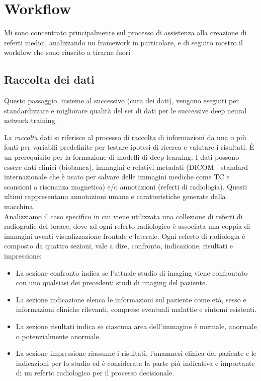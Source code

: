 \documentclass[12pt,a4paper]{report}
\begin{document}
\section{Workflow}
Mi sono concentrato principalmente sul processo di assistenza alla creazione di referti medici, analizzando un framework in particolare, e di seguito mostro il workflow che sono riuscito a tirarne fuori

\subsection{Raccolta dei dati}
Questo passaggio, insieme al successivo (cura dei dati), vengono eseguiti per standardizzare e migliorare qualità del set di dati per le successive deep neural network training.

La \emph{raccolta} dati si riferisce al processo di raccolta di informazioni da una o più fonti per variabili predefinite per testare ipotesi di ricerca e valutare i risultati. È un prerequisito per la formazione di modelli di deep learning. 
I dati possono essere dati clinici (biobanca), immagini e relativi metadati (DICOM - standard internazionale che è usato per salvare delle immagini mediche come TC e scansioni a risonanza magnetica) e/o annotazioni (referti di radiologia). Questi ultimi rappresentano annotazioni umane e caratteristiche generate dalla macchina.\\
Analizziamo il caso specifico in cui viene utilizzata una collezione di referti di radiografie del torace, dove ad ogni referto radiologico è associata una coppia di immagini aventi visualizzazione frontale e laterale. Ogni referto di radiologia è composto da quattro sezioni, vale a dire, confronto, indicazione, risultati e impressione:
\begin{itemize}
\item La sezione confronto indica se l'attuale studio di imaging viene confrontato con uno qualsiasi dei precedenti studi di imaging del paziente.
\item La sezione indicazione elenca le informazioni sul paziente come età, sesso e informazioni cliniche rilevanti, comprese eventuali malattie e sintomi esistenti.
\item La sezione risultati indica se ciascuna area dell'immagine è normale, anormale o potenzialmente anormale.
\item La sezione impressione riassume i risultati, l'anamnesi clinica del paziente e le indicazioni per lo studio ed è considerata la parte più indicativa e importante di un referto radiologico per il processo decisionale.
\end{itemize}
\end{document}
